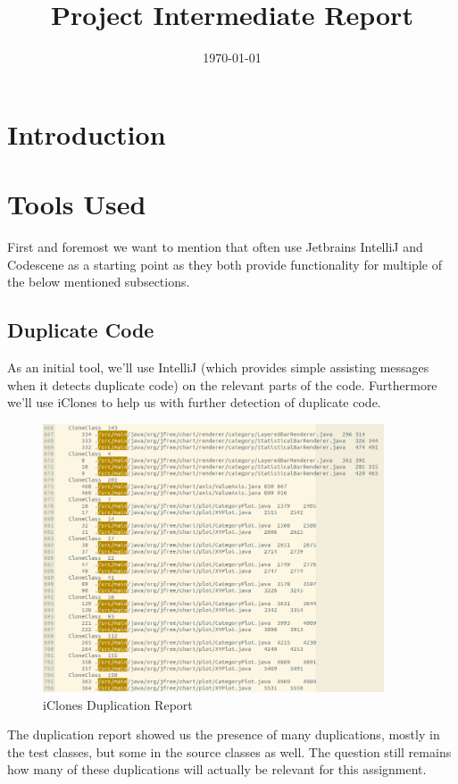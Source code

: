 \documentclass{article}
\title{\textmd{\textbf{Project Intermediate Report}}\\\normalsize\vspace{0.1in}\Large{\projectnaam}}
\author{\student}\date{\today}
\begin{document}
\maketitle
\newpage

\section{Introduction}

\section{Tools Used}

First and foremost we want to mention that often use Jetbrains IntelliJ and Codescene as a starting point as they both provide functionality for multiple of the below mentioned subsections.

\subsection{Duplicate Code}

As an initial tool, we'll use IntelliJ (which provides simple assisting messages when it detects duplicate code) on the relevant parts of the code. Furthermore we'll use iClones to help us with further detection of duplicate code.

\begin{figure}[H]
\centering
	\includegraphics[width=0.9\textwidth]{iclones_dup.png}
	\caption{iClones Duplication Report}
\end{figure}

The duplication report showed us the presence of many duplications, mostly in the test classes, but some in the source classes as well. The question still remains how many of these duplications will actually be relevant for this assignment.
\end{document}
